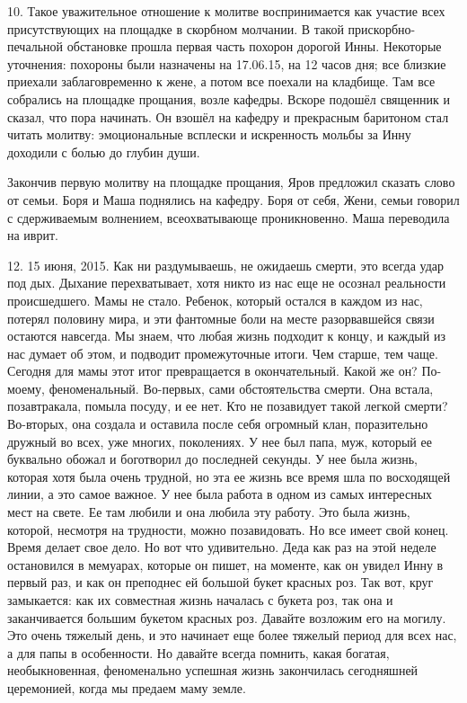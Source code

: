 \label{296-1}
10. Такое уважительное отношение к молитве воспринимается как участие всех присутствующих на площадке в скорбном молчании. В такой прискорбно-печальной обстановке прошла первая часть похорон дорогой Инны. Некоторые уточнения: похороны были назначены на 17.06.15, на 12 часов дня; все близкие приехали заблаговременно к жене, а потом все поехали на кладбище. Там все собрались на площадке прощания, возле кафедры. Вскоре подошёл священник и сказал, что пора начинать. Он взошёл на кафедру и прекрасным баритоном стал читать молитву: эмоциональные всплески и искренность мольбы за Инну доходили с болью до глубин души.

\label{297-1}
Закончив первую молитву на площадке прощания, Яров предложил сказать слово от семьи. Боря и Маша поднялись на кафедру. Боря от себя, Жени, семьи говорил с сдерживаемым волнением, всеохватывающе проникновенно. Маша переводила на иврит.

\label{298-1}
12. 15 июня, 2015. Как ни раздумываешь, не ожидаешь смерти, это всегда удар под дых. Дыхание перехватывает, хотя никто из нас еще не осознал реальности происшедшего. Мамы не стало. Ребенок, который остался в каждом из нас, потерял половину мира, и эти фантомные боли на месте разорвавшейся связи остаются навсегда. Мы знаем, что любая жизнь подходит к концу, и каждый из нас думает об этом, и подводит промежуточные итоги. Чем старше, тем чаще. Сегодня для мамы этот итог превращается в окончательный. Какой же он? По-моему, феноменальный. Во-первых, сами обстоятельства смерти. Она встала, позавтракала, помыла посуду, и ее нет. Кто не позавидует такой легкой смерти? Во-вторых, она создала и оставила после себя огромный клан, поразительно дружный во всех, уже многих, поколениях. У нее был папа, муж, который ее буквально обожал и боготворил до последней секунды. У нее была жизнь, которая хотя была очень трудной, но эта ее жизнь все время шла по восходящей линии, а это самое важное. У нее была работа в одном из самых интересных мест на свете. Ее там любили и она любила эту работу. Это была жизнь, которой, несмотря на трудности, можно позавидовать. Но все имеет свой конец. Время делает свое дело. Но вот что удивительно. Деда как раз на этой неделе остановился в мемуарах, которые он пишет, на моменте, как он увидел Инну в первый раз, и как он преподнес ей большой букет красных роз. Так вот, круг замыкается: как их совместная жизнь началась с букета роз, так она и заканчивается большим букетом красных роз. Давайте возложим его на могилу. Это очень тяжелый день, и это начинает еще более тяжелый период для всех нас, а для папы в особенности. Но давайте всегда помнить, какая богатая, необыкновенная, феноменально успешная жизнь закончилась сегодняшней церемонией, когда мы предаем маму земле.

